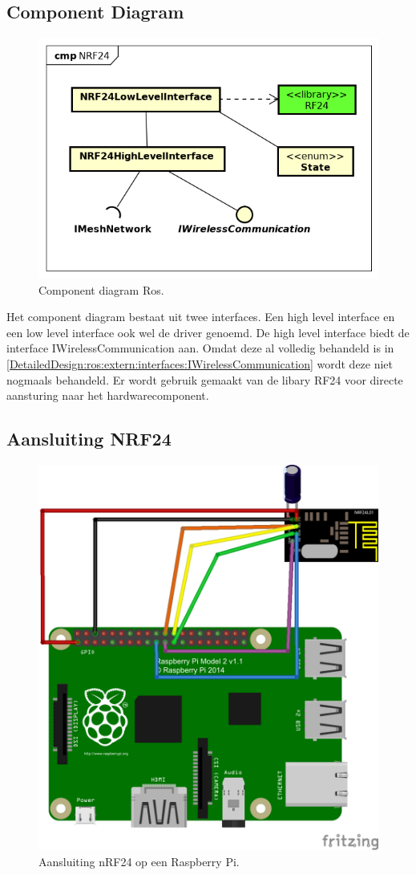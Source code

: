 \documentclass[a4paper, 11pt, oneside]{report}
\begin{document}
\subsection{Component Diagram}
\label{DetailedDesign:NRF24:ComponentDiagram}
\begin{figure}[H]
	\begin{center}\includegraphics[width=.5\linewidth]{Afbeeldingen/NRF24ComponentDiagram.png}\end{center}
	\caption{Component diagram Ros.}
	\label{fig:component:NRF24}
\end{figure}

Het component diagram bestaat uit twee interfaces. Een high level interface en een low level interface ook wel de driver genoemd.
De high level interface biedt de interface IWirelessCommunication aan. Omdat deze al volledig behandeld is in \autoref{DetailedDesign:ros:extern:interfaces:IWirelessCommunication}  wordt deze niet nogmaals behandeld. Er wordt gebruik gemaakt van de libary RF24 \cite{nrf24git} voor directe aansturing naar het hardwarecomponent.

\subsection{Aansluiting NRF24}

\begin{figure}[H]
	\begin{center}\includegraphics[width=.4\linewidth]{Afbeeldingen/fritzing_raspberry_nrf.png}\end{center}
	\caption{Aansluiting nRF24 op een Raspberry Pi.}
	\label{fig:component:aansluting}
\end{figure}
\end{document}
